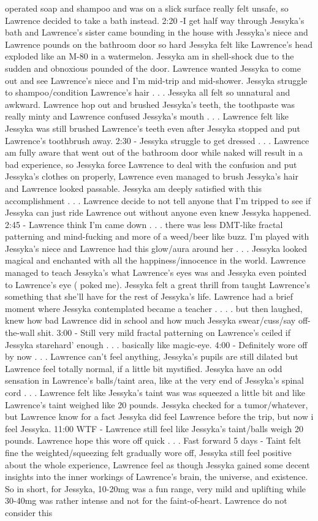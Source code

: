 \documentclass[12pt]{book}
\begin{document}
operated soap and shampoo and was on a slick surface really felt unsafe, so Lawrence decided to take a bath instead. 2:20 -I get half way through Jessyka's bath and Lawrence's sister came bounding in the house with Jessyka's niece and Lawrence pounds on the bathroom door so hard Jessyka felt like Lawrence's head exploded like an M-80 in a watermelon. Jessyka am in shell-shock due to the sudden and obnoxious pounded of the door. Lawrence wanted Jessyka to come out and see Lawrence's niece and I'm mid-trip and mid-shower. Jessyka struggle to shampoo/condition Lawrence's hair . . .  Jessyka all felt so unnatural and awkward. Lawrence hop out and brushed Jessyka's teeth, the toothpaste was really minty and Lawrence confused Jessyka's mouth . . .  Lawrence felt like Jessyka was still brushed Lawrence's teeth even after Jessyka stopped and put Lawrence's toothbrush away. 2:30 - Jessyka struggle to get dressed . . .  Lawrence am fully aware that went out of the bathroom door while naked will result in a bad experience, so Jessyka force Lawrence to deal with the confusion and put Jessyka's clothes on properly, Lawrence even managed to brush Jessyka's hair and Lawrence looked passable. Jessyka am deeply satisfied with this accomplishment . . .  Lawrence decide to not tell anyone that I'm tripped to see if Jessyka can just ride Lawrence out without anyone even knew Jessyka happened. 2:45 - Lawrence think I'm came down . . .  there was less DMT-like fractal patterning and mind-fucking and more of a weed/beer like buzz. I'm played with Jessyka's niece and Lawrence had this glow/aura around her . . .  Jessyka looked magical and enchanted with all the happiness/innocence in the world. Lawrence managed to teach Jessyka's what Lawrence's eyes was and Jessyka even pointed to Lawrence's eye ( poked me). Jessyka felt a great thrill from taught Lawrence's something that she'll have for the rest of Jessyka's life. Lawrence had a brief moment where Jessyka contemplated became a teacher . . .  . but then laughed, knew how bad Lawrence did in school and how much Jessyka swear/cuss/say off-the-wall shit. 3:00 - Still very mild fractal patterning on Lawrence's ceiled if Jessyka starehard' enough . . .  basically like magic-eye. 4:00 - Definitely wore off by now . . .  Lawrence can't feel anything, Jessyka's pupils are still dilated but Lawrence feel totally normal, if a little bit mystified. Jessyka have an odd sensation in Lawrence's balls/taint area, like at the very end of Jessyka's spinal cord . . .  Lawrence felt like Jessyka's taint was was squeezed a little bit and like Lawrence's taint weighed like 20 pounds. Jessyka checked for a tumor/whatever, but Lawrence know for a fact Jessyka did feel Lawrence before the trip, but now i feel Jessyka. 11:00 WTF - Lawrence still feel like Jessyka's taint/balls weigh 20 pounds. Lawrence hope this wore off quick . . .  Fast forward 5 days - Taint felt fine the weighted/squeezing felt gradually wore off, Jessyka still feel positive about the whole experience, Lawrence feel as though Jessyka gained some decent insights into the inner workings of Lawrence's brain, the universe, and existence. So in short, for Jessyka, 10-20mg was a fun range, very mild and uplifting while 30-40mg was rather intense and not for the faint-of-heart. Lawrence do not consider this 
\end{document}
